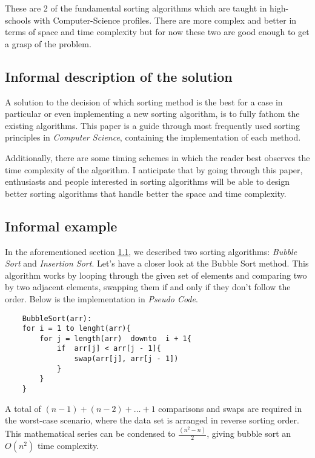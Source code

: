 \documentclass[11pt, letter paper]{article}
\begin{document}
    These are 2 of the fundamental sorting algorithms which are taught in high-schools with Computer-Science profiles. There are more complex and better in terms of space and time complexity but for now these two are good enough to get a grasp of the problem.

    \subsection{Informal description of the solution}
    \label{sec:descrip}
    A solution to the decision of which sorting method is the best for a case in particular or even implementing a new sorting algorithm, is to fully fathom the existing algorithms. This paper is a guide through most frequently used sorting principles in \textsl{Computer Science}, containing the implementation of each method. 
    
    Additionally, there are some timing schemes in which the reader best observes the time complexity of the algorithm. I anticipate that by going through this paper, enthusiasts and people interested in sorting algorithms will be able to design better sorting algorithms that handle better the space and time complexity. 

    \subsection{Informal example}
    \label{sec:example}
    
    In the aforementioned section \hyperref[sec:motiv]{1.1}, we described two sorting algorithms: \textit{Bubble Sort} and \textit{Insertion Sort}. Let's have a closer look at the Bubble Sort method. This algorithm works by looping through the given set of elements and comparing two by two adjacent elements, swapping them if and only if they don’t follow the order. Below is the implementation in \emph{Pseudo Code}.

    \begin{lstlisting}
    BubbleSort(arr):
    for i = 1 to lenght(arr){
        for j = length(arr)  downto  i + 1{
            if  arr[j] < arr[j - 1]{
                swap(arr[j], arr[j - 1])
            }
        }
    }
    \end{lstlisting}

    A total of $(n-1) + (n-2) +\dotsc+ 1$ comparisons and swaps are required in the worst-case scenario, where the data set is arranged in reverse sorting order. This mathematical series can be condensed to $\frac{(n^2 - n)}{2}$, giving bubble sort an $O(n^2)$ time complexity.
\end{document}
